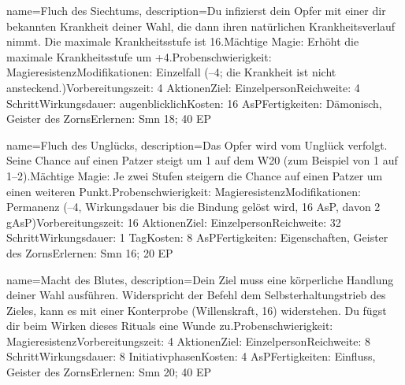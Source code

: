 {
    name={Fluch des Siechtums},
    description={Du infizierst dein Opfer mit einer dir bekannten Krankheit deiner Wahl, die dann ihren natürlichen Krankheitsverlauf nimmt. Die maximale Krankheitsstufe ist 16.\newline Mächtige Magie: Erhöht die maximale Krankheitsstufe um +4.\newline Probenschwierigkeit: Magieresistenz\newline Modifikationen: Einzelfall (–4; die Krankheit ist nicht ansteckend.)\newline Vorbereitungszeit: 4 Aktionen\newline Ziel: Einzelperson\newline Reichweite: 4 Schritt\newline Wirkungsdauer: augenblicklich\newline Kosten: 16 AsP\newline Fertigkeiten: Dämonisch, Geister des Zorns\newline Erlernen: Smn 18; 40 EP}
}


{
    name={Fluch des Unglücks},
    description={Das Opfer wird vom Unglück verfolgt. Seine Chance auf einen Patzer steigt um 1 auf dem W20 (zum Beispiel von 1 auf 1–2).\newline Mächtige Magie: Je zwei Stufen steigern die Chance auf einen Patzer um einen weiteren Punkt.\newline Probenschwierigkeit: Magieresistenz\newline Modifikationen: Permanenz (–4, Wirkungsdauer bis die Bindung gelöst wird, 16 AsP, davon 2 gAsP)\newline Vorbereitungszeit: 16 Aktionen\newline Ziel: Einzelperson\newline Reichweite: 32 Schritt\newline Wirkungsdauer: 1 Tag\newline Kosten: 8 AsP\newline Fertigkeiten: Eigenschaften, Geister des Zorns\newline Erlernen: Smn 16; 20 EP}
}


{
    name={Macht des Blutes},
    description={Dein Ziel muss eine körperliche Handlung deiner Wahl ausführen. Widerspricht der Befehl dem Selbsterhaltungstrieb des Zieles, kann es mit einer Konterprobe (Willenskraft, 16) widerstehen. Du fügst dir beim Wirken dieses Rituals eine Wunde zu.\newline Probenschwierigkeit: Magieresistenz\newline Vorbereitungszeit: 4 Aktionen\newline Ziel: Einzelperson\newline Reichweite: 8 Schritt\newline Wirkungsdauer: 8 Initiativphasen\newline Kosten: 4 AsP\newline Fertigkeiten: Einfluss, Geister des Zorns\newline Erlernen: Smn 20; 40 EP}
}


